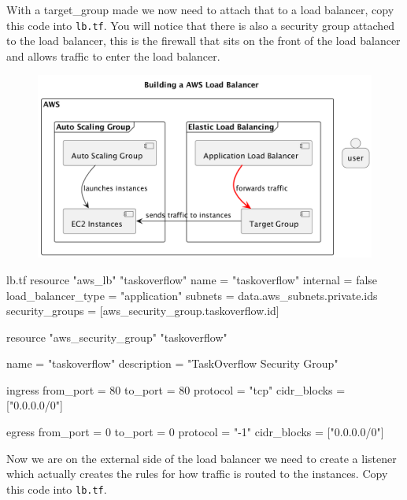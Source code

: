 \documentclass{csse4400}
\begin{document}
With a target\_group made we now need to attach that to a load balancer, copy this code into \texttt{lb.tf}. You will notice that there is also a security group attached to the load balancer, this is the firewall that sits on the front of the load balancer and allows traffic to enter the load balancer.

\begin{figure}[H]
  \begin{center}
    \includegraphics[scale=0.2]{diagrams/lb3}
  \end{center}
\end{figure}

\begin{code}[language=terraform,numbers=none,keepspaces=true]{lb.tf}
resource "aws_lb" "taskoverflow" {
  name               = "taskoverflow"
  internal           = false
  load_balancer_type = "application"
  subnets            = data.aws_subnets.private.ids
  security_groups    = [aws_security_group.taskoverflow.id]
}

resource "aws_security_group" "taskoverflow" {
  name          = "taskoverflow"
  description   = "TaskOverflow Security Group"

  ingress {
    from_port   = 80
    to_port     = 80
    protocol    = "tcp"
    cidr_blocks = ["0.0.0.0/0"]
  }

  egress {
    from_port   = 0
    to_port     = 0
    protocol    = "-1"
    cidr_blocks = ["0.0.0.0/0"]
  }
}
\end{code}

Now we are on the external side of the load balancer we need to create a listener which actually creates the rules for how traffic is routed to the instances. Copy this code into \texttt{lb.tf}.
\end{document}
